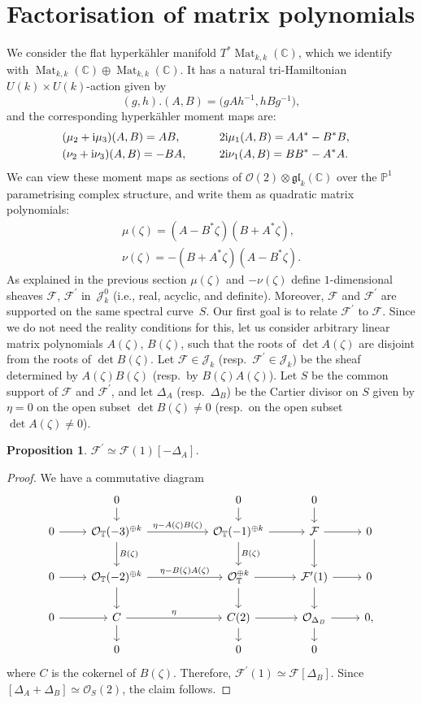 \documentclass[10pt,a4paper]{amsart}
\newcommand{\gl}{{\mathfrak g \mathfrak l}}
\newcommand{\cx}{{\mathbb C}}
\newcommand{\Mat}{\operatorname{Mat}}
\numberwithin{equation}{section}
\newtheorem{Proposition}[Theorem]{Proposition}
 { \theoremstyle{definition}
\newtheorem{Definition}[Theorem]{Definition}
\newtheorem{Note}[Theorem]{Note}
\newtheorem{Example}[Theorem]{Example}
\newtheorem{Remark}[Theorem]{Remark} }
\newcommand{\oP}{{\mathbb{P}}}
\newcommand{\oT}{{\mathbb{T}}}
\newcommand{\sF}{{\mathcal{F}}}
\newcommand{\sO}{{\mathcal{O}}}
\begin{document}
\section{Factorisation of matrix polynomials}
We consider the flat hyperk\"ahler manifold $T^\ast \Mat_{k,k}(\cx)$, which we identify with $\Mat_{k,k}(\cx)\oplus \Mat_{k,k}(\cx)$.
It has a natural tri-Hamiltonian $U(k)\times U(k)$-action given by
\[
(g,h).(A,B)=\big(gAh^{-1},hBg^{-1}\big),
\]
and the corresponding hyperk\"ahler moment maps are:
\begin{alignat*}{3}
& (\mu_2+{\rm i}\mu_3)(A,B)=AB,\qquad&& 2{\rm i}\mu_1(A,B)=AA^\ast-B^\ast B,&
\\
&(\nu_2+{\rm i}\nu_3)(A,B)=-BA,\qquad && 2{\rm i}\nu_1(A,B)=BB^\ast-A^\ast A.&
\end{alignat*}
We can view these moment maps as sections of $\sO(2)\otimes \gl_k(\cx)$ over the $\oP^1$ parametrising complex structure, and write them as quadratic matrix polynomials:
\begin{gather}\mu(\zeta)=(A-B^\ast\zeta)(B+A^\ast\zeta),\label{mu}
\\
 \nu(\zeta)=-(B+A^\ast\zeta)(A-B^\ast\zeta).\label{nu}
 \end{gather}
As explained in the previous section $\mu(\zeta)$ and $-\nu(\zeta)$ define $1$-dimensional sheaves $\sF$, $\sF^\prime$ in~$\mathscr{J}_k^0$
(i.e., real, acyclic, and definite). Moreover, $\sF$ and $\sF^\prime$ are supported on the same spectral curve~$S$. Our first goal is to relate $\sF^\prime$ to $\sF$. Since we do not need the reality conditions for this, let us consider arbitrary linear matrix polynomials $A(\zeta)$, $B(\zeta)$, such that the roots of $\det A(\zeta)$ are disjoint from the roots of $\det B(\zeta)$. Let $\sF\in \mathscr{J}_k$ (resp.~$\sF^\prime\in \mathscr{J}_k$) be the sheaf determined by $A(\zeta)B(\zeta)$ (resp.~by $B(\zeta)A(\zeta)$). Let $S$ be the common support of $\sF$ and $\sF^\prime$, and let $\Delta_A$ (resp.~$\Delta_B$) be the Cartier divisor on $S$ given by $\eta=0$ on the open subset $\det B(\zeta)\neq 0$ (resp.~on the open subset $\det A(\zeta)\neq 0$).
\begin{Proposition} $\sF^\prime\simeq \sF(1)[-\Delta_A]$.
\label{sF'}\end{Proposition}
\begin{proof} We have a commutative diagram
\[
\begin{tikzcd} & 0 \ar[d] &[30pt] 0 \ar[d]& 0\ar[d] &\\[-6pt] 0 \ar[r] & \sO_{\oT}(-3)^{\oplus k}\ar[r, "\eta-A(\zeta)B(\zeta)"] \ar[d, "B(\zeta)"] &\sO_\oT(-1)^{\oplus k} \ar[d, "B(\zeta)"] \ar[r]& \sF\ar[r]\ar[d] & 0\\[3pt]
0 \ar[r] &\sO_\oT(-2)^{\oplus k}\ar[r, "\eta-B(\zeta)A(\zeta)"]\ar[d]& \sO_\oT^{\oplus k}\ar[r] \ar[d] &\sF^\prime(1)\ar[r]\ar[d] & 0\\ 0\ar[r] &C \ar[d]\ar[r, "\eta"]& C(2) \ar[d]\ar[r] & \sO_{\Delta_B}\ar[d]\ar[r] & 0,\\[-6pt] & 0 & 0 & 0 &
\end{tikzcd}
\]
where $C$ is the cokernel of $B(\zeta)$.
Therefore, $\sF^\prime(1)\simeq \sF[\Delta_B]$. Since $[\Delta_A+\Delta_B]\simeq \sO_S(2)$, the claim follows.
\end{proof}
\end{document}
